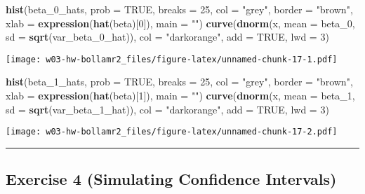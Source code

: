 \documentclass[
]{article}
\newenvironment{Shaded}{\begin{snugshade}}{\end{snugshade}}
\newcommand{\DataTypeTok}[1]{\textcolor[rgb]{0.13,0.29,0.53}{#1}}
\newcommand{\DecValTok}[1]{\textcolor[rgb]{0.00,0.00,0.81}{#1}}
\newcommand{\KeywordTok}[1]{\textcolor[rgb]{0.13,0.29,0.53}{\textbf{#1}}}
\newcommand{\NormalTok}[1]{#1}
\newcommand{\OtherTok}[1]{\textcolor[rgb]{0.56,0.35,0.01}{#1}}
\newcommand{\StringTok}[1]{\textcolor[rgb]{0.31,0.60,0.02}{#1}}
\begin{document}
\begin{Shaded}
\begin{Highlighting}[]
\KeywordTok{hist}\NormalTok{(beta_}\DecValTok{0}\NormalTok{_hats, }\DataTypeTok{prob =} \OtherTok{TRUE}\NormalTok{, }\DataTypeTok{breaks =} \DecValTok{25}\NormalTok{, }\DataTypeTok{col =} \StringTok{"grey"}\NormalTok{, }\DataTypeTok{border =} \StringTok{"brown"}\NormalTok{, }\DataTypeTok{xlab =} \KeywordTok{expression}\NormalTok{(}\KeywordTok{hat}\NormalTok{(beta)[}\DecValTok{0}\NormalTok{]), }\DataTypeTok{main =} \StringTok{""}\NormalTok{)}
\KeywordTok{curve}\NormalTok{(}\KeywordTok{dnorm}\NormalTok{(x, }\DataTypeTok{mean =}\NormalTok{ beta_}\DecValTok{0}\NormalTok{, }\DataTypeTok{sd =} \KeywordTok{sqrt}\NormalTok{(var_beta_}\DecValTok{0}\NormalTok{_hat)), }\DataTypeTok{col =} \StringTok{"darkorange"}\NormalTok{, }\DataTypeTok{add =} \OtherTok{TRUE}\NormalTok{, }\DataTypeTok{lwd =} \DecValTok{3}\NormalTok{)}
\end{Highlighting}
\end{Shaded}

\texttt{[image: w03-hw-bollamr2\_files/figure-latex/unnamed-chunk-17-1.pdf]}

\begin{Shaded}
\begin{Highlighting}[]
\KeywordTok{hist}\NormalTok{(beta_}\DecValTok{1}\NormalTok{_hats, }\DataTypeTok{prob =} \OtherTok{TRUE}\NormalTok{, }\DataTypeTok{breaks =} \DecValTok{25}\NormalTok{, }\DataTypeTok{col =} \StringTok{"grey"}\NormalTok{, }\DataTypeTok{border =} \StringTok{"brown"}\NormalTok{, }\DataTypeTok{xlab =} \KeywordTok{expression}\NormalTok{(}\KeywordTok{hat}\NormalTok{(beta)[}\DecValTok{1}\NormalTok{]), }\DataTypeTok{main =} \StringTok{""}\NormalTok{)}
\KeywordTok{curve}\NormalTok{(}\KeywordTok{dnorm}\NormalTok{(x, }\DataTypeTok{mean =}\NormalTok{ beta_}\DecValTok{1}\NormalTok{, }\DataTypeTok{sd =} \KeywordTok{sqrt}\NormalTok{(var_beta_}\DecValTok{1}\NormalTok{_hat)), }\DataTypeTok{col =} \StringTok{"darkorange"}\NormalTok{, }\DataTypeTok{add =} \OtherTok{TRUE}\NormalTok{, }\DataTypeTok{lwd =} \DecValTok{3}\NormalTok{)}
\end{Highlighting}
\end{Shaded}

\texttt{[image: w03-hw-bollamr2\_files/figure-latex/unnamed-chunk-17-2.pdf]}

\begin{center}\rule{0.5\linewidth}{0.5pt}\end{center}

\hypertarget{exercise-4-simulating-confidence-intervals}{%
\subsection{Exercise 4 (Simulating Confidence
Intervals)}\label{exercise-4-simulating-confidence-intervals}}
\end{document}
